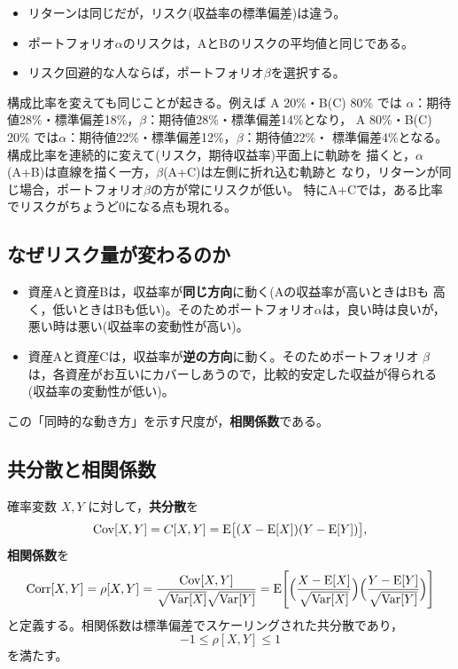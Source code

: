 \begin{itemize}
\item リターンは同じだが，リスク(収益率の標準偏差)は違う。
\item ポートフォリオ$\alpha$のリスクは，AとBのリスクの平均値と同じである。
\item リスク回避的な人ならば，ポートフォリオ$\beta$を選択する。
\end{itemize}

構成比率を変えても同じことが起きる。例えば A 20\%・B(C) 80\% では
$\alpha$：期待値28\%・標準偏差18\%，$\beta$：期待値28\%・標準偏差14\%となり，
A 80\%・B(C) 20\% では$\alpha$：期待値22\%・標準偏差12\%，$\beta$：期待値22\%・
標準偏差4\%となる。構成比率を連続的に変えて(リスク，期待収益率)平面上に軌跡を
描くと，$\alpha$(A+B)は直線を描く一方，$\beta$(A+C)は左側に折れ込む軌跡と
なり，リターンが同じ場合，ポートフォリオ$\beta$の方が常にリスクが低い。
特にA+Cでは，ある比率でリスクがちょうど0になる点も現れる。

\subsection{なぜリスク量が変わるのか}

\begin{itemize}
\item 資産Aと資産Bは，収益率が\textbf{同じ方向}に動く(Aの収益率が高いときはBも
高く，低いときはBも低い)。そのためポートフォリオ$\alpha$は，良い時は良いが，
悪い時は悪い(収益率の変動性が高い)。
\item 資産Aと資産Cは，収益率が\textbf{逆の方向}に動く。そのためポートフォリオ
$\beta$は，各資産がお互いにカバーしあうので，比較的安定した収益が得られる
(収益率の変動性が低い)。
\end{itemize}

この「同時的な動き方」を示す尺度が，\textbf{相関係数}である。

\subsection{共分散と相関係数}

\begin{definition}[共分散と相関係数]
確率変数 $X, Y$ に対して，\textbf{共分散}を
\begin{equation}
\mathrm{Cov}[X,Y] = C[X,Y] = \mathrm{E}\bigl[(X-\mathrm{E}[X])(Y-\mathrm{E}[Y])\bigr],
\end{equation}
\textbf{相関係数}を
\begin{equation}
\mathrm{Corr}[X,Y] = \rho[X,Y]
= \frac{\mathrm{Cov}[X,Y]}{\sqrt{\mathrm{Var}[X]}\sqrt{\mathrm{Var}[Y]}}
= \mathrm{E}\Biggl[\Bigl(\frac{X-\mathrm{E}[X]}{\sqrt{\mathrm{Var}[X]}}\Bigr)
\Bigl(\frac{Y-\mathrm{E}[Y]}{\sqrt{\mathrm{Var}[Y]}}\Bigr)\Biggr]
\end{equation}
と定義する。相関係数は標準偏差でスケーリングされた共分散であり，
\begin{equation}
-1 \leq \rho[X,Y] \leq 1
\end{equation}
を満たす。
\end{definition}

